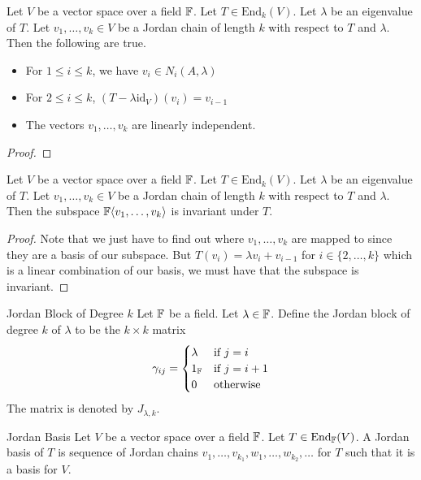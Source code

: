 \documentclass[a4paper]{article}
\begin{document}
\begin{lmm}{}{} Let $V$ be a vector space over a field $\mathbb{F}$. Let $T\in\text{End}_k(V)$. Let $\lambda$ be an eigenvalue of $T$. Let $v_1,\dots,v_k\in V$ be a Jordan chain of length $k$ with respect to $T$ and $\lambda$. Then the following are true. 
\begin{itemize}
\item For $1\leq i\leq k$, we have $v_i\in N_i(A,\lambda)$
\item For $2\leq i\leq k$, $(T-\lambda\text{id}_V)(v_i)=v_{i-1}$
\item The vectors $v_1,\dots,v_k$ are linearly independent. 
\end{itemize} \tcbline
\begin{proof}
\end{proof}
\end{lmm}

\begin{prp}{}{} Let $V$ be a vector space over a field $\mathbb{F}$. Let $T\in\text{End}_k(V)$. Let $\lambda$ be an eigenvalue of $T$. Let $v_1,\dots,v_k\in V$ be a Jordan chain of length $k$ with respect to $T$ and $\lambda$. Then the subspace $\mathbb{F}\langle v_1,\dots,v_k\rangle$ is invariant under $T$. \tcbline
\begin{proof}
Note that we just have to find out where $v_1,\dots,v_k$ are mapped to since they are a basis of our subspace. But $T(v_i)=\lambda v_i+v_{i-1}$ for $i\in\{2,\dots,k\}$ which is a linear combination of our basis, we must have that the subspace is invariant. 
\end{proof}
\end{prp}

\begin{defn}{Jordan Block of Degree $k$}{} Let $\mathbb{F}$ be a field. Let $\lambda\in\mathbb{F}$. Define the Jordan block of degree $k$ of $\lambda$ to be the $k\times k$ matrix $$
\gamma_{ij}=\begin{cases}
\lambda & \text{if $j=i$}\\
1_{\mathbb{F}} & \text{if $j=i+1$}\\
0 & \text{otherwise}
\end{cases}$$
The matrix is denoted by $J_{\lambda,k}$. 
\end{defn}

\begin{defn}{Jordan Basis}{} Let $V$ be a vector space over a field $\mathbb{F}$. Let $T\in\text{End}_{\mathbb{F}}(V)$. A Jordan basis of $T$ is sequence of Jordan chains $v_1,\dots,v_{k_1},w_1,\dots,w_{k_2},\dots$ for $T$ such that it is a basis for $V$. 
\end{defn}
\end{document}

